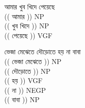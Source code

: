 \documentclass[11pt,a4paper]{article}
\begin{document}
	\begin{enumerate}

	{\bg 

		\item আমার খুব খিদে পেয়েছে \\
		$ $\\
		\textcolor{diff}{(( আমার ))} NP\\
		\textcolor{diff}{(( খুব খিদে ))} NP\\
		\textcolor{diff}{(( পেয়েছে ))} VGF\\
$ $\\
		\item ভেজা মেঝেতে দৌড়োতে হয় না বাবা  \\
		$ $\\
		\textcolor{diff}{(( ভেজা মেঝেতে ))} NP\\
		\textcolor{diff}{(( দৌড়োতে ))} NP\\
		\textcolor{diff}{(( হয় ))} VGF\\
		\textcolor{diff}{(( না ))} NEGP\\
		\textcolor{diff}{(( বাবা ))} NP\\

}
\end{enumerate}
\end{document}

